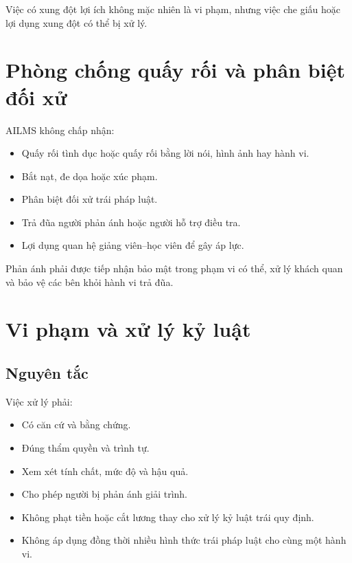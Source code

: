 \documentclass[12pt,a4paper]{article}
\begin{document}
Việc có xung đột lợi ích không mặc nhiên là vi phạm,
nhưng việc che giấu hoặc lợi dụng xung đột có thể bị xử lý.

\section{Phòng chống quấy rối và phân biệt đối xử}

AILMS không chấp nhận:

\begin{itemize}
    \item Quấy rối tình dục hoặc quấy rối bằng lời nói, hình ảnh hay hành vi.
    \item Bắt nạt, đe dọa hoặc xúc phạm.
    \item Phân biệt đối xử trái pháp luật.
    \item Trả đũa người phản ánh hoặc người hỗ trợ điều tra.
    \item Lợi dụng quan hệ giảng viên--học viên để gây áp lực.
\end{itemize}

Phản ánh phải được tiếp nhận bảo mật trong phạm vi có thể,
xử lý khách quan và bảo vệ các bên khỏi hành vi trả đũa.

\section{Vi phạm và xử lý kỷ luật}

\subsection{Nguyên tắc}

Việc xử lý phải:

\begin{itemize}
    \item Có căn cứ và bằng chứng.
    \item Đúng thẩm quyền và trình tự.
    \item Xem xét tính chất, mức độ và hậu quả.
    \item Cho phép người bị phản ánh giải trình.
    \item Không phạt tiền hoặc cắt lương thay cho xử lý kỷ luật trái quy định.
    \item Không áp dụng đồng thời nhiều hình thức trái pháp luật cho cùng một hành vi.
\end{itemize}
\end{document}
